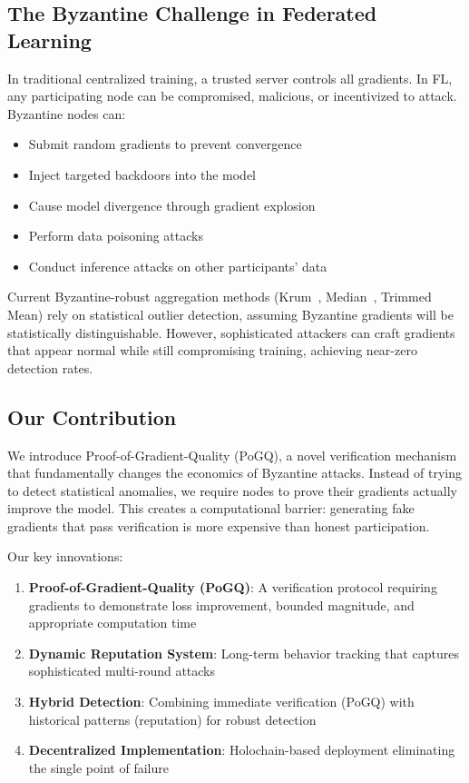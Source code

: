 \documentclass[conference]{IEEEtran}
\begin{document}
\subsection{The Byzantine Challenge in Federated Learning}

In traditional centralized training, a trusted server controls all gradients. In FL, any participating node can be compromised, malicious, or incentivized to attack. Byzantine nodes can:
\begin{itemize}
\item Submit random gradients to prevent convergence
\item Inject targeted backdoors into the model
\item Cause model divergence through gradient explosion
\item Perform data poisoning attacks
\item Conduct inference attacks on other participants' data
\end{itemize}

Current Byzantine-robust aggregation methods (Krum~\cite{blanchard2017krum}, Median~\cite{yin2018byzantine}, Trimmed Mean) rely on statistical outlier detection, assuming Byzantine gradients will be statistically distinguishable. However, sophisticated attackers can craft gradients that appear normal while still compromising training, achieving near-zero detection rates.

\subsection{Our Contribution}

We introduce Proof-of-Gradient-Quality (PoGQ), a novel verification mechanism that fundamentally changes the economics of Byzantine attacks. Instead of trying to detect statistical anomalies, we require nodes to prove their gradients actually improve the model. This creates a computational barrier: generating fake gradients that pass verification is more expensive than honest participation.

Our key innovations:
\begin{enumerate}
\item \textbf{Proof-of-Gradient-Quality (PoGQ)}: A verification protocol requiring gradients to demonstrate loss improvement, bounded magnitude, and appropriate computation time
\item \textbf{Dynamic Reputation System}: Long-term behavior tracking that captures sophisticated multi-round attacks
\item \textbf{Hybrid Detection}: Combining immediate verification (PoGQ) with historical patterns (reputation) for robust detection
\item \textbf{Decentralized Implementation}: Holochain-based deployment eliminating the single point of failure
\end{enumerate}
\end{document}
